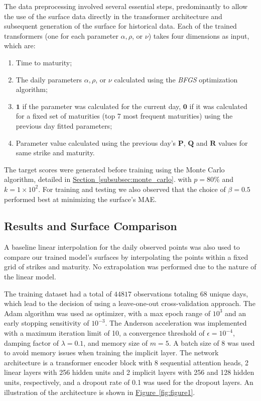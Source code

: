 The data preprocessing involved several essential steps, predominantly to allow the use of the surface data directly
in the transformer architecture and subsequent generation of the surface for historical data.
Each of the trained transformers (one for each parameter $\alpha, \rho$, or $\nu$) takes four dimensions as input, which are:
\begin{enumerate}
    \item Time to maturity;
    \item The daily parameters $\alpha, \rho$, or $\nu$ calculated using the \textit{BFGS} optimization algorithm;
    \item $\mathbf{1}$ if the parameter was calculated for the current day, $\mathbf{0}$ if it was calculated for a fixed set of maturities
    (top 7 most frequent maturities) using the previous day fitted parameters;
    \item Parameter value calculated using the previous day's $\mathbf{P}$, $\mathbf{Q}$ and $\mathbf{R}$ values for same strike and maturity.
\end{enumerate}

The target scores were generated before training using the Monte Carlo algorithm, detailed in \hyperref[subsubsec:monte_carlo]{Section~\ref*{subsubsec:monte_carlo}}.
with $p = 80\%$ and $k = 1 \times 10^{2}$.
For training and testing we also observed that the choice of $\beta = 0.5$ performed best at minimizing the surface's MAE.

\subsection{Results and Surface Comparison}
\label{subsec:results}

A baseline linear interpolation for the daily observed points was also used to compare our trained
model's surfaces by interpolating the points within a fixed grid of strikes and maturity.
No extrapolation was performed due to the nature of the linear model.

The training dataset had a total of $44817$ observations totaling 68 unique days, which lead to the decision of using a leave-one-out cross-validation approach.
The Adam algorithm was used as optimizer, with a max epoch range of $10^{3}$ and an early stopping sensitivity of $10^{-3}$.
The Anderson acceleration was implemented with a maximum iteration limit of 10, a
convergence threshold of $\epsilon=10^{-4}$, damping factor of $\lambda=0.1$, and memory size of $m=5$.
A batch size of 8 was used to avoid memory issues when training the implicit layer.
The network architecture is a transformer encoder block with 8 sequential attention heads,
2 linear layers with 256 hidden units and 2 implicit layers with 256 and 128 hidden units, respectively, and a dropout rate of 0.1 was used for the dropout layers.
An illustration of the architecture is shown in \hyperref[fig:figure1]{Figure~\ref*{fig:figure1}}.

